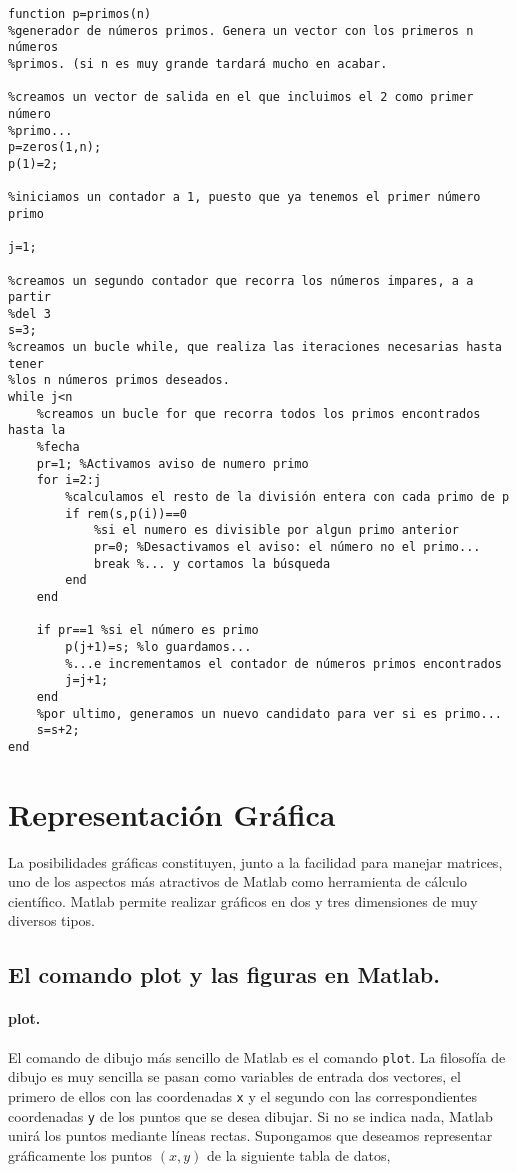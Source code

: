 \begin{verbatim}
function p=primos(n)
%generador de números primos. Genera un vector con los primeros n números
%primos. (si n es muy grande tardará mucho en acabar.

%creamos un vector de salida en el que incluimos el 2 como primer número
%primo...
p=zeros(1,n);
p(1)=2;

%iniciamos un contador a 1, puesto que ya tenemos el primer número primo

j=1;

%creamos un segundo contador que recorra los números impares, a a partir
%del 3
s=3;
%creamos un bucle while, que realiza las iteraciones necesarias hasta tener
%los n números primos deseados.
while j<n
    %creamos un bucle for que recorra todos los primos encontrados hasta la
    %fecha
    pr=1; %Activamos aviso de numero primo
    for i=2:j
        %calculamos el resto de la división entera con cada primo de p
        if rem(s,p(i))==0
            %si el numero es divisible por algun primo anterior
            pr=0; %Desactivamos el aviso: el número no el primo...
            break %... y cortamos la búsqueda
        end
    end
      
    if pr==1 %si el número es primo
        p(j+1)=s; %lo guardamos...
        %...e incrementamos el contador de números primos encontrados
        j=j+1; 
    end
    %por ultimo, generamos un nuevo candidato para ver si es primo...
    s=s+2;
end 
\end{verbatim}
 
\section{Representación Gráfica}
La posibilidades gráficas constituyen, junto a la facilidad para manejar matrices, uno de los aspectos más atractivos de Matlab como herramienta de cálculo científico. Matlab permite realizar gráficos en dos y tres dimensiones de muy diversos tipos. 

\subsection{El comando plot y las figuras en Matlab.}
\paragraph{plot.} El comando de dibujo más sencillo de Matlab es el comando \texttt{plot}. La filosofía de dibujo es muy sencilla se pasan como variables de entrada dos vectores, el primero de ellos con las coordenadas \texttt{x} y el segundo con las correspondientes coordenadas \texttt{y} de los puntos que se desea dibujar. Si no se indica nada, Matlab unirá los puntos mediante líneas rectas. Supongamos que deseamos representar gráficamente los puntos $(x,y)$ de la siguiente tabla de datos,

